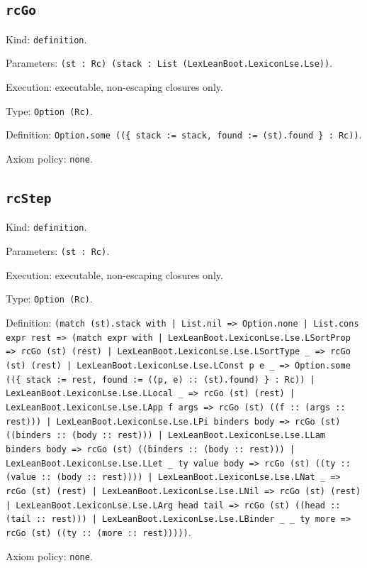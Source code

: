 \documentclass[11pt]{article}
\begin{document}
\subsection*{\texttt{rcGo}}
\noindent Kind: \texttt{definition}.\par
\noindent Parameters: \texttt{(st : Rc) (stack : List (LexLeanBoot.LexiconLse.Lse))}.\par
\noindent Execution: executable, non-escaping closures only.\par
\noindent Type: \texttt{Option (Rc)}.\par
\noindent Definition: \texttt{Option.some ((\{ stack := stack, found := (st).found \} : Rc))}.\par
\noindent Axiom policy: \texttt{none}.\par
\subsection*{\texttt{rcStep}}
\noindent Kind: \texttt{definition}.\par
\noindent Parameters: \texttt{(st : Rc)}.\par
\noindent Execution: executable, non-escaping closures only.\par
\noindent Type: \texttt{Option (Rc)}.\par
\noindent Definition: \texttt{(match (st).stack with | List.nil => Option.none | List.cons expr rest => (match expr with | LexLeanBoot.LexiconLse.Lse.LSortProp => rcGo (st) (rest) | LexLeanBoot.LexiconLse.Lse.LSortType \_ => rcGo (st) (rest) | LexLeanBoot.LexiconLse.Lse.LConst p e \_ => Option.some ((\{ stack := rest, found := ((p, e) :: (st).found) \} : Rc)) | LexLeanBoot.LexiconLse.Lse.LLocal \_ => rcGo (st) (rest) | LexLeanBoot.LexiconLse.Lse.LApp f args => rcGo (st) ((f :: (args :: rest))) | LexLeanBoot.LexiconLse.Lse.LPi binders body => rcGo (st) ((binders :: (body :: rest))) | LexLeanBoot.LexiconLse.Lse.LLam binders body => rcGo (st) ((binders :: (body :: rest))) | LexLeanBoot.LexiconLse.Lse.LLet \_ ty value body => rcGo (st) ((ty :: (value :: (body :: rest)))) | LexLeanBoot.LexiconLse.Lse.LNat \_ => rcGo (st) (rest) | LexLeanBoot.LexiconLse.Lse.LNil => rcGo (st) (rest) | LexLeanBoot.LexiconLse.Lse.LArg head tail => rcGo (st) ((head :: (tail :: rest))) | LexLeanBoot.LexiconLse.Lse.LBinder \_ \_ ty more => rcGo (st) ((ty :: (more :: rest)))))}.\par
\noindent Axiom policy: \texttt{none}.\par
\end{document}
